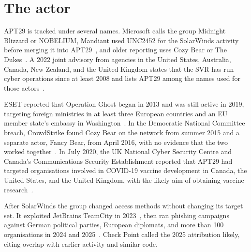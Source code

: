 \section{The actor}
\label{sec:actor}

APT29 is tracked under several names. Microsoft calls the group Midnight Blizzard or NOBELIUM, Mandiant used UNC2452 for the SolarWinds activity before merging it into APT29~\cite{mandiant-unc2452}, and older reporting uses Cozy Bear or The Dukes~\cite{mitre-apt29,eset-ghost}. A 2022 joint advisory from agencies in the United States, Australia, Canada, New Zealand, and the United Kingdom states that the SVR has run cyber operations since at least 2008 and lists APT29 among the names used for those actors~\cite{aa22-110a}.

ESET reported that Operation Ghost began in 2013 and was still active in 2019, targeting foreign ministries in at least three European countries and an EU member state's embassy in Washington~\cite{eset-ghost}. In the Democratic National Committee breach, CrowdStrike found Cozy Bear on the network from summer 2015 and a separate actor, Fancy Bear, from April 2016, with no evidence that the two worked together~\cite{crowdstrike-dnc}. In July 2020, the UK National Cyber Security Centre and Canada's Communications Security Establishment reported that APT29 had targeted organisations involved in COVID-19 vaccine development in Canada, the United States, and the United Kingdom, with the likely aim of obtaining vaccine research~\cite{ncsc-vaccine}.

After SolarWinds the group changed access methods without changing its target set. It exploited JetBrains TeamCity in 2023~\cite{aa23-347a}, then ran phishing campaigns against German political parties, European diplomats, and more than 100 organisations in 2024 and 2025~\cite{mandiant-wineloader,ms-rdp,checkpoint-2025}. Check Point called the 2025 attribution likely, citing overlap with earlier activity and similar code.
